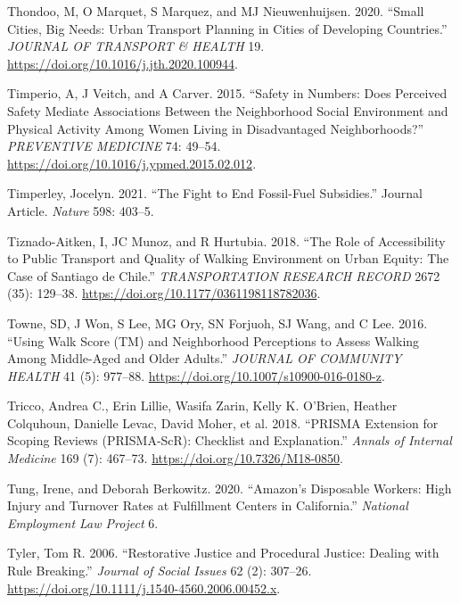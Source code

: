 \documentclass[12pt, oneside]{report}
\newlength{\cslhangindent}
\newlength{\cslentryspacingunit} %
\newenvironment{CSLReferences}[2] %
 {%
  \setlength{\parindent}{0pt}
  \ifodd #1
  \let\oldpar\par
  \def\par{\hangindent=\cslhangindent\oldpar}
  \fi
  \setlength{\parskip}{#2\cslentryspacingunit}
 }%
 {}
\begin{document}
\begin{CSLReferences}{1}{0}
\leavevmode{}%
Thondoo, M, O Marquet, S Marquez, and MJ Nieuwenhuijsen. 2020. {``Small
Cities, Big Needs: {Urban} Transport Planning in Cities of Developing
Countries.''} \emph{JOURNAL OF TRANSPORT \& HEALTH} 19.
\url{https://doi.org/10.1016/j.jth.2020.100944}.

\leavevmode{}%
Timperio, A, J Veitch, and A Carver. 2015. {``Safety in Numbers: {Does}
Perceived Safety Mediate Associations Between the Neighborhood Social
Environment and Physical Activity Among Women Living in Disadvantaged
Neighborhoods?''} \emph{PREVENTIVE MEDICINE} 74: 49--54.
\url{https://doi.org/10.1016/j.ypmed.2015.02.012}.

\leavevmode{}%
Timperley, Jocelyn. 2021. {``The Fight to End Fossil-Fuel Subsidies.''}
Journal Article. \emph{Nature} 598: 403--5.

\leavevmode{}%
Tiznado-Aitken, I, JC Munoz, and R Hurtubia. 2018. {``The {Role} of
{Accessibility} to {Public Transport} and {Quality} of {Walking
Environment} on {Urban Equity}: {The Case} of {Santiago} de {Chile}.''}
\emph{TRANSPORTATION RESEARCH RECORD} 2672 (35): 129--38.
\url{https://doi.org/10.1177/0361198118782036}.

\leavevmode{}%
Towne, SD, J Won, S Lee, MG Ory, SN Forjuoh, SJ Wang, and C Lee. 2016.
{``Using {Walk Score} ({TM}) and {Neighborhood Perceptions} to {Assess
Walking Among Middle-Aged} and {Older Adults}.''} \emph{JOURNAL OF
COMMUNITY HEALTH} 41 (5): 977--88.
\url{https://doi.org/10.1007/s10900-016-0180-z}.

\leavevmode{}%
Tricco, Andrea C., Erin Lillie, Wasifa Zarin, Kelly K. O'Brien, Heather
Colquhoun, Danielle Levac, David Moher, et al. 2018. {``{PRISMA
Extension} for {Scoping Reviews} ({PRISMA-ScR}): {Checklist} and
{Explanation}.''} \emph{Annals of Internal Medicine} 169 (7): 467--73.
\url{https://doi.org/10.7326/M18-0850}.

\leavevmode{}%
Tung, Irene, and Deborah Berkowitz. 2020. {``Amazon's Disposable
Workers: High Injury and Turnover Rates at Fulfillment Centers in
California.''} \emph{National Employment Law Project} 6.

\leavevmode{}%
Tyler, Tom R. 2006. {``Restorative Justice and Procedural Justice:
Dealing with Rule Breaking.''} \emph{Journal of Social Issues} 62 (2):
307--26. \url{https://doi.org/10.1111/j.1540-4560.2006.00452.x}.


\end{CSLReferences}
\end{document}
